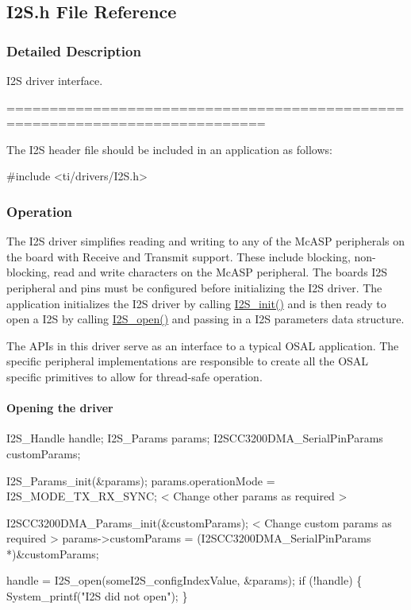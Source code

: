 \subsection{I2\+S.\+h File Reference}
\label{_i2_s_8h}


\subsubsection{Detailed Description}
I2\+S driver interface. 

============================================================================

The I2\+S header file should be included in an application as follows\+: 
\begin{DoxyCode}
\textcolor{preprocessor}{#include <ti/drivers/I2S.h>}
\end{DoxyCode}


\subsubsection*{Operation}

The I2\+S driver simplifies reading and writing to any of the Mc\+A\+S\+P peripherals on the board with Receive and Transmit support. These include blocking, non-\/blocking, read and write characters on the Mc\+A\+S\+P peripheral. The board\textquotesingle{}s I2\+S peripheral and pins must be configured before initializing the I2\+S driver. The application initializes the I2\+S driver by calling \hyperlink{_i2_s_8h_a79e8fdf40ee80c49b2cac09a3e428a82}{I2\+S\+\_\+init()} and is then ready to open a I2\+S by calling \hyperlink{_i2_s_8h_aad4ce7cbdf38dc5597f5a92ad056ebc1}{I2\+S\+\_\+open()} and passing in a I2\+S parameters data structure.

The A\+P\+Is in this driver serve as an interface to a typical O\+S\+A\+L application. The specific peripheral implementations are responsible to create all the O\+S\+A\+L specific primitives to allow for thread-\/safe operation.

\paragraph*{Opening the driver}


\begin{DoxyCode}
I2S_Handle      handle;
I2S_Params      params;
I2SCC3200DMA_SerialPinParams customParams;

I2S_Params_init(&params);
params.operationMode                     = I2S\_MODE\_TX\_RX\_SYNC;
< Change other params as required >

I2SCC3200DMA_Params_init(&customParams);
< Change custom params as required >
params->customParams = (I2SCC3200DMA_SerialPinParams *)&customParams;

handle = I2S_open(someI2S\_configIndexValue, &params);
\textcolor{keywordflow}{if} (!handle) \{
    System\_printf(\textcolor{stringliteral}{"I2S did not open"});
\}
\end{DoxyCode}


